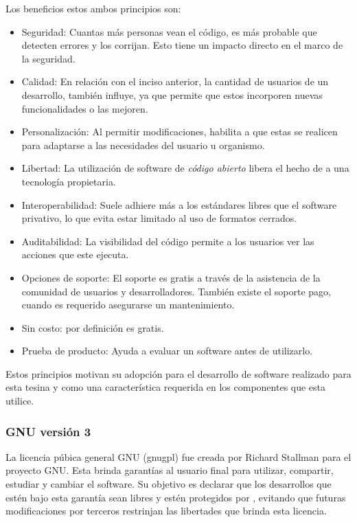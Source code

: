 Los beneficios estos ambos principios\cite{noyes2010openSourceGood} son:
\begin{itemize}
\item Seguridad: Cuantas más personas vean el código, es más probable que detecten errores y los corrijan. Esto tiene un impacto directo en el marco de la seguridad.
\item Calidad: En relación con el inciso anterior, la cantidad de usuarios de un desarrollo, también influye, ya que permite que estos incorporen nuevas funcionalidades o las mejoren.
\item Personalización: Al permitir modificaciones, habilita a que estas se realicen para adaptarse a las necesidades del usuario u organismo.
\item Libertad: La utilización de software de \textit{código abierto} libera el hecho de  a una tecnología propietaria.
\item Interoperabilidad: Suele adhiere más a los estándares libres que el software privativo, lo que evita estar limitado al uso de formatos cerrados.
\item Auditabilidad: La visibilidad del código permite a los usuarios ver las acciones que este ejecuta.
\item Opciones de soporte: El soporte es gratis a través de la asistencia de la comunidad de usuarios y desarrolladores. También existe el soporte pago, cuando es requerido asegurarse un mantenimiento.
\item Sin costo: por definición es gratis.
\item Prueba de producto: Ayuda a evaluar un software antes de utilizarlo.
\end{itemize}

Estos principios motivan su adopción para el desarrollo de software realizado para esta tesina y como una característica requerida en los componentes que esta utilice. 

\subsubsection{GNU  versión 3}
\label{gnu_gpl_v3}

La licencia púbica general GNU (\gls{gnugpl}) fue creada por Richard Stallman para el proyecto GNU. Esta brinda garantías al usuario final para utilizar, compartir, estudiar y cambiar el software. Su objetivo es declarar que los desarrollos que estén bajo esta garantía sean libres y estén protegidos por , evitando que futuras modificaciones por terceros restrinjan las libertades que brinda esta licencia.

